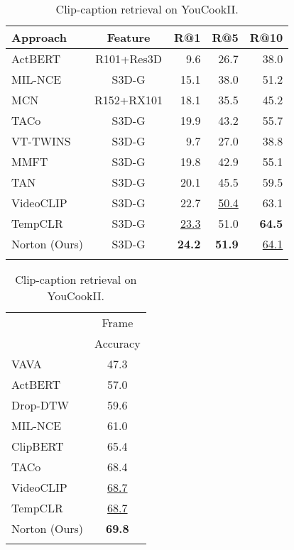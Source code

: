 \begin{table}[h]
\parbox[t]{.54\textwidth}
    {
     \centering
    \caption{Clip-caption retrieval on YouCookII. }
    \label{tab:youcook}
    {
    \begin{tabular}{l|c|rrr}
	\shline
        Approach      & Feature   & R@1       & R@5       & R@10      \\
        \hline
  ActBERT~\citep{actbert}       & R101+Res3D & 9.6  & 26.7 & 38.0 \\
 MIL-NCE~\citep{milnce}         & S3D-G      & 15.1 & 38.0 & 51.2 \\
MCN~\citep{chen2021multimodal}       & R152+RX101 & 18.1 & 35.5 & 45.2 \\
 TACo~\citep{yang2021taco} &S3D-G &19.9&43.2&55.7\\
 VT-TWINS~\citep{vttwins}&	S3D-G       &9.7& 27.0 &38.8\\
  MMFT~\citep{shvetsova2022everything} & S3D-G&19.8&42.9&55.1 \\             
  TAN~\citep{tan} & S3D-G & 20.1& 45.5 &59.5  \\
  VideoCLIP~\citep{videoclip}    & S3D-G      & 22.7 & \underline{50.4} & {63.1} \\
  TempCLR~\citep{tempclr}                  & S3D-G      & \underline{23.3} & {51.0} & \textbf{64.5} \\
   Norton (Ours)& S3D-G & \textbf{24.2}& \textbf{51.9} & \underline{64.1}\\   
   
        \shline          
    \end{tabular}

    }
}
\hfill
\parbox[t]{.4\textwidth}
    {    
    \centering
{}
\begin{tabular}{lc} 
\shline
\multirow{2}{*}{Approach} & Frame \\
& Accuracy \\
\hline 
VAVA~\citep{liu2022learning}&47.3 \\
ActBERT~\citep{actbert} & 57.0 \\
Drop-DTW~\citep{dropdtw} & 59.6\\
MIL-NCE~\citep{milnce}& 61.0 \\
ClipBERT~\citep{clipbert}& 65.4\\
TACo~\citep{yang2021taco}&68.4\\
VideoCLIP~\citep{videoclip} & \underline{68.7} \\
TempCLR~\citep{tempclr} & \underline{68.7} \\
Norton (Ours) & \textbf{69.8} \\
\shline
\end{tabular}
\label{tab:coin}
    }
\end{table}

